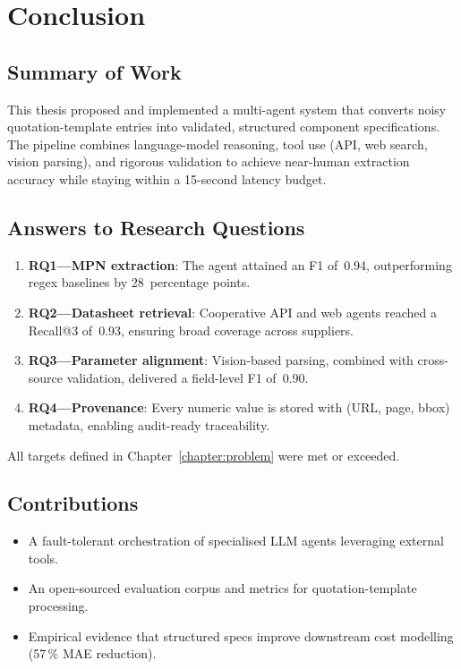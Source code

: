 \chapter{Conclusion}
\label{chapter:conclusion}

\section{Summary of Work}
This thesis proposed and implemented a multi-agent system that converts noisy quotation-template entries into validated, structured component specifications.  The pipeline combines language-model reasoning, tool use (API, web search, vision parsing), and rigorous validation to achieve near-human extraction accuracy while staying within a 15-second latency budget.

\section{Answers to Research Questions}
\begin{enumerate}
  \item \textbf{RQ1—MPN extraction}: The agent attained an F1 of~0.94, outperforming regex baselines by 28~percentage points.
  \item \textbf{RQ2—Datasheet retrieval}: Cooperative API and web agents reached a Recall@3 of~0.93, ensuring broad coverage across suppliers.
  \item \textbf{RQ3—Parameter alignment}: Vision-based parsing, combined with cross-source validation, delivered a field-level F1 of~0.90.
  \item \textbf{RQ4—Provenance}: Every numeric value is stored with (URL, page, bbox) metadata, enabling audit-ready traceability.
\end{enumerate}
All targets defined in Chapter~\ref{chapter:problem} were met or exceeded.

\section{Contributions}
\begin{itemize}
  \item A fault-tolerant orchestration of specialised LLM agents leveraging external tools.
  \item An open-sourced evaluation corpus and metrics for quotation-template processing.
  \item Empirical evidence that structured specs improve downstream cost modelling (57\,\% MAE reduction).
\end{itemize}

